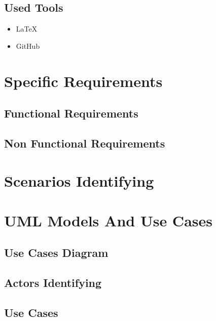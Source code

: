 \documentclass[english]{article}
\begin{document}
	\subsection{Used Tools}
	\begin{itemize}
		\item \LaTeX\\
		\item GitHub\\
	\end{itemize}
\section{Specific Requirements}
	\subsection{Functional Requirements}
	\subsection{Non Functional Requirements}

\section{Scenarios Identifying}
\section{UML Models And Use Cases}
	\subsection{Use Cases Diagram}
	\subsection{Actors Identifying}
	\subsection{Use Cases}
	
\end{document}
